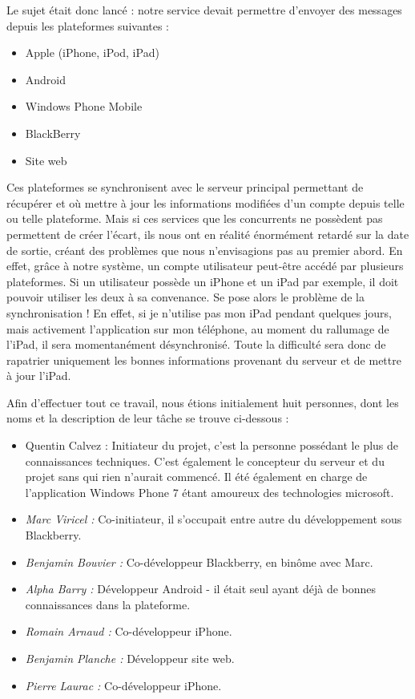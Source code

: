 \documentclass{article}
\begin{document}
Le sujet était donc lancé : notre service devait permettre d’envoyer des messages depuis les plateformes suivantes :
\begin{itemize}
\item Apple (iPhone, iPod, iPad)
\item Android
\item Windows Phone Mobile
\item BlackBerry
\item Site web
\end{itemize}

Ces plateformes se synchronisent avec le serveur principal permettant de récupérer et où mettre à jour les informations modifiées d’un compte depuis telle ou telle plateforme. Mais si ces services que les concurrents ne possèdent pas permettent de créer l’écart, ils nous ont en réalité énormément retardé sur la date de sortie, créant des problèmes que nous n’envisagions pas au premier abord. En effet, grâce à notre système, un compte utilisateur peut-être accédé par plusieurs plateformes. Si un utilisateur possède un iPhone et un iPad par exemple, il doit pouvoir utiliser les deux à sa convenance.  Se pose alors le problème de la synchronisation ! En effet, si je n’utilise pas mon iPad pendant quelques jours, mais activement l’application sur mon téléphone,  au moment du rallumage de l’iPad, il sera momentanément désynchronisé. Toute la difficulté sera donc de rapatrier uniquement les bonnes informations provenant du serveur et de mettre à jour l’iPad.

Afin d'effectuer tout ce travail, nous étions initialement huit personnes, dont les noms et la description de leur tâche se trouve ci-dessous :
	\begin{itemize}
		\item Quentin Calvez : Initiateur du projet, c'est la personne possédant le plus de connaissances techniques. C'est également le concepteur du serveur et du projet sans qui rien n'aurait commencé. Il été également en charge de l'application Windows Phone 7 étant amoureux des technologies microsoft.
		\item \emph{Marc Viricel :} Co-initiateur, il s'occupait entre autre du développement sous Blackberry.
		\item \emph{Benjamin Bouvier :} Co-développeur Blackberry, en binôme avec Marc.
		\item \emph{Alpha Barry :} Développeur Android - il était seul ayant déjà de bonnes connaissances dans la plateforme.
		\item \emph{Romain Arnaud :} Co-développeur iPhone.
		\item \emph{Benjamin Planche :} Développeur site web.
		\item \emph{Pierre Laurac :} Co-développeur iPhone.
	\end{itemize}
\end{document}
